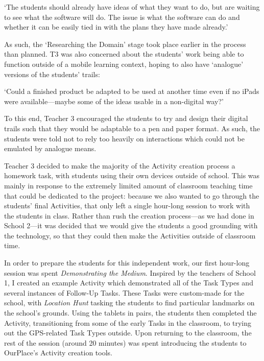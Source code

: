 \begin{displayquote}
`The students should already have ideas of what they want to do, but are waiting to see what the software will do. The issue is what the software can do and whether it can be easily tied in with the plans they have made already.'
\end{displayquote}

As such, the `Researching the Domain' stage took place earlier in the process than planned. T3 was also concerned about the students' work being able to function outside of a mobile learning context, hoping to also have `analogue' versions of the students' trails: 

\begin{displayquote}
`Could a finished product be adapted to be used at another time even if no iPads were available---maybe some of the ideas usable in a non-digital way?'
\end{displayquote}

To this end, Teacher 3 encouraged the students to try and design their digital trails such that they would be adaptable to a pen and paper format. As such, the students were told not to rely too heavily on interactions which could not be emulated by analogue means.

Teacher 3 decided to make the majority of the Activity creation process a homework task, with students using their own devices outside of school. This was mainly in response to the extremely limited amount of classroom teaching time that could be dedicated to the project: because we also wanted to go through the students' final Activities, that only left a single hour-long session to work with the students in class. Rather than rush the creation process---as we had done in School 2---it was decided that we would give the students a good grounding with the technology, so that they could then make the Activities outside of classroom time. 

In order to prepare the students for this independent work, our first hour-long session was spent \textit{Demonstrating the Medium}. Inspired by the teachers of School 1, I created an example Activity which demonstrated all of the Task Types and several instances of Follow-Up Tasks. These Tasks were custom-made for the school, with \textit{Location Hunt} tasking the students to find particular landmarks on the school's grounds. Using the tablets in pairs, the students then completed the Activity, transitioning from some of the early Tasks in the classroom, to trying out the GPS-related Task Types outside. Upon returning to the classroom, the rest of the session (around 20 minutes) was spent introducing the students to OurPlace's Activity creation tools.

